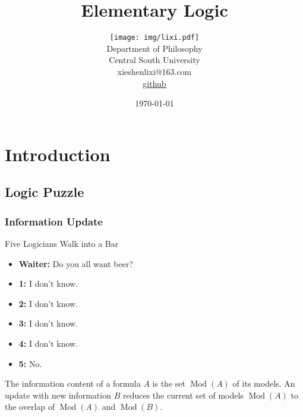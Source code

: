 \documentclass[UTF8,11pt,colorlinks,compress,openany]{beamer}%
\begin{document}
\title{Elementary Logic}
\author{
	{\texttt{[image: img/lixi.pdf]}}\\
	\small Department of Philosophy\\
	\footnotesize Central South University\\
	\scriptsize xieshenlixi@163.com\\
	\scriptsize \href{https://github.com/rickylixi/logic}{github}
}
\date{\today}
\maketitle





\section{Introduction}

\subsection{Logic Puzzle}

\begin{frame}\frametitle{Information Update}
\begin{block}{Five Logicians Walk into a Bar}
	\begin{itemize}
		\item \textbf{Waiter:} Do you all want beer?
		\item \textbf{1:} I don't know.
		\item \textbf{2:} I don't know.
		\item \textbf{3:} I don't know.
		\item \textbf{4:} I don't know.
		\item \textbf{5:} No.
	\end{itemize}	
\end{block}
The information content of a formula $A$ is the set $\operatorname{Mod}(A)$ of its models. An update with new information $B$ reduces the current set of models $\operatorname{Mod}(A)$ to the overlap of $\operatorname{Mod}(A)$ and $\operatorname{Mod}(B)$.
\end{frame}
\end{document}

